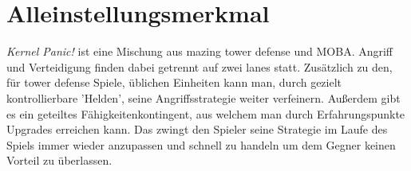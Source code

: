 \section{Alleinstellungsmerkmal}


\textit{Kernel Panic!} ist eine Mischung aus mazing tower defense und MOBA.
Angriff und Verteidigung finden dabei getrennt auf zwei lanes statt.
Zusätzlich zu den, für tower defense Spiele, üblichen Einheiten kann man, durch gezielt kontrollierbare 'Helden', seine Angriffsstrategie weiter verfeinern.
Außerdem gibt es ein geteiltes Fähigkeitenkontingent, aus welchem man durch Erfahrungspunkte Upgrades erreichen kann. Das zwingt den Spieler seine Strategie im Laufe des Spiels immer wieder anzupassen und schnell zu handeln um dem Gegner keinen Vorteil zu überlassen.
